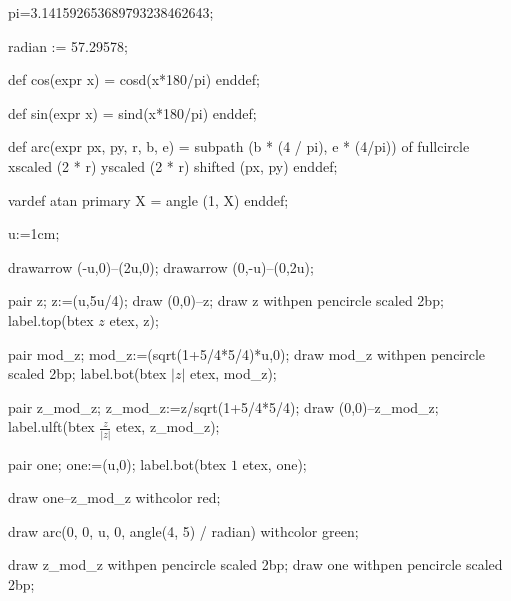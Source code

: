 pi=3.141592653689793238462643;

radian := 57.29578;

def cos(expr x) = cosd(x*180/pi) enddef;

def sin(expr x) = sind(x*180/pi) enddef;

def arc(expr px, py, r, b, e) = subpath (b * (4 / pi), e * (4/pi)) of fullcircle xscaled (2 * r) yscaled (2 * r) shifted (px, py) enddef;

vardef atan primary X = angle (1, X) enddef;


u:=1cm;

drawarrow (-u,0)--(2u,0);
drawarrow (0,-u)--(0,2u);

pair z;
z:=(u,5u/4);
draw (0,0)--z;
draw z withpen pencircle scaled 2bp;
label.top(btex $z$ etex, z);

pair mod_z;
mod_z:=(sqrt(1+5/4*5/4)*u,0);
draw mod_z withpen pencircle scaled 2bp;
label.bot(btex $|z|$ etex, mod_z);

pair z_mod_z;
z_mod_z:=z/sqrt(1+5/4*5/4);
draw (0,0)--z_mod_z;
label.ulft(btex $\frac{z}{|z|}$ etex, z_mod_z);

pair one;
one:=(u,0);
label.bot(btex $1$ etex, one);

draw one--z_mod_z withcolor red;

draw arc(0, 0, u, 0, angle(4, 5) / radian) withcolor green;

draw z_mod_z withpen pencircle scaled 2bp;
draw one withpen pencircle scaled 2bp;